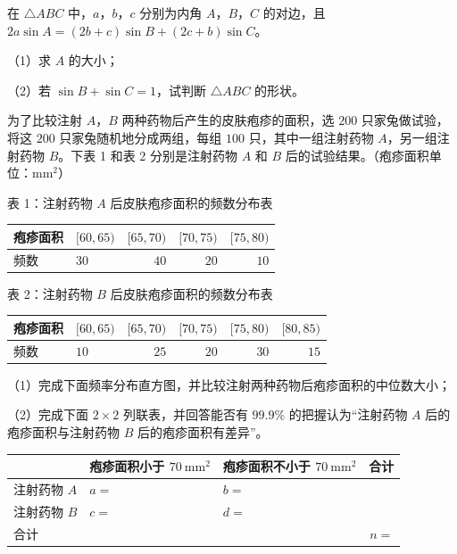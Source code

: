\endgroup
{}
\begin{question}
在 $\triangle ABC$ 中，$a$，$b$，$c$ 分别为内角 $A$，$B$，$C$ 的对边，且 $2a\sin A=(2b+c)\sin B+(2c+b)\sin C$。

（1）求 $A$ 的大小；

（2）若 $\sin B+\sin C=1$，试判断 $\triangle ABC$ 的形状。

\Needspace{0.4\textheight}
\end{question}
\begingroup
\renewenvironment{question}{\Needspace{0.5\textheight}}{}
\begin{question}
为了比较注射 $A$，$B$ 两种药物后产生的皮肤疱疹的面积，选 $200$ 只家兔做试验，将这 $200$ 只家兔随机地分成两组，每组 $100$ 只，其中一组注射药物 $A$，另一组注射药物 $B$。下表 1 和表 2 分别是注射药物 $A$ 和 $B$ 后的试验结果。（疱疹面积单位：$\mathrm{mm}^2$）

表 1：注射药物 $A$ 后皮肤疱疹面积的频数分布表

\begin{center}
\begin{tabular}{llrrr}
\toprule
疱疹面积 & $[60,65)$ & $[65,70)$ & $[70,75)$ & $[75,80)$ \\
\midrule
频数 & $30$ & $40$ & $20$ & $10$ \\
\bottomrule
\end{tabular}
\end{center}

表 2：注射药物 $B$ 后皮肤疱疹面积的频数分布表

\begin{center}
\begin{tabular}{llrrrr}
\toprule
疱疹面积 & $[60,65)$ & $[65,70)$ & $[70,75)$ & $[75,80)$ & $[80,85)$ \\
\midrule
频数 & $10$ & $25$ & $20$ & $30$ & $15$ \\
\bottomrule
\end{tabular}
\end{center}

（1）完成下面频率分布直方图，并比较注射两种药物后疱疹面积的中位数大小；
\nopagebreak[4]
\begin{center}\end{center}
\nopagebreak[4]
（2）完成下面 $2\times2$ 列联表，并回答能否有 $99.9\%$ 的把握认为“注射药物 $A$ 后的疱疹面积与注射药物 $B$ 后的疱疹面积有差异”。

\begin{center}
\begin{tabular}{lllr}
\toprule
 & 疱疹面积小于 $70\ \mathrm{mm}^2$ & 疱疹面积不小于 $70\ \mathrm{mm}^2$ & 合计 \\
\midrule
注射药物 $A$ & $a=$ & $b=$ &  \\
注射药物 $B$ & $c=$ & $d=$ &  \\
合计 &  &  & $n=$ \\
\bottomrule
\end{tabular}
\end{center}


\end{question}
